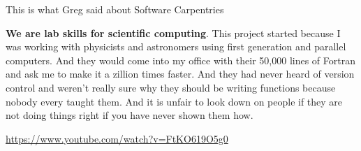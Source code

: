 \begin{frame}{This is what Greg said about Software Carpentries}
	\begin{alertblock}{}
		\textbf{We are lab skills for scientific computing}. This project started because I was working with physicists and astronomers using first generation and parallel computers. And they would come into my office with their 50,000 lines of Fortran and ask me to make it a zillion times faster. And they had never heard of version control and weren't really sure why they should be writing functions because nobody every taught them. And it is unfair to look down on people if they are not doing things right if you have never shown them how.
		\linebreak
		
		\tiny\url{https://www.youtube.com/watch?v=FtKO619O5g0}
	\end{alertblock}

\end{frame}